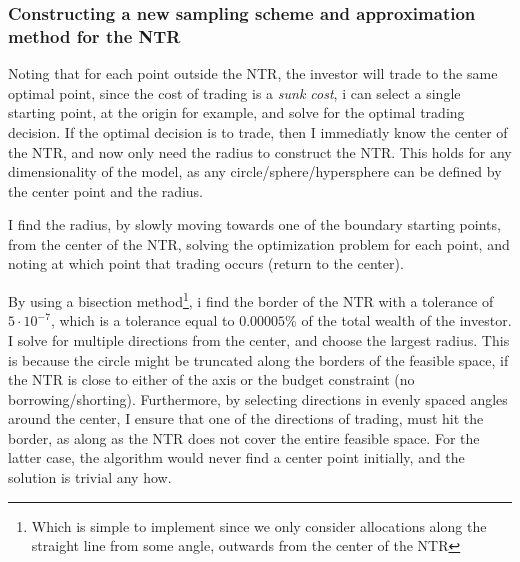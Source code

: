 \documentclass[11pt]{article}
\begin{document}
\subsubsection{Constructing a new sampling scheme and approximation method for the NTR} \label{Subsubsection: SampleFixed}
Noting that for each point outside the NTR, the investor will trade to the same optimal point, since the cost of trading is a \textit{sunk cost},
i can select a single starting point, at the origin for example, and solve for the optimal trading decision.
If the optimal decision is to trade, then I immediatly know the center of the \ac{NTR}, and now only need the radius to construct the \ac{NTR}.
This holds for any dimensionality of the model, as any circle/sphere/hypersphere can be defined by the center point and the radius.

I find the radius, by slowly moving towards one of the boundary starting points, from the center of the NTR, solving the optimization problem for each point,
and noting at which point that trading occurs (return to the center).

By using a bisection method\footnote{Which is simple to implement since we only consider allocations along the straight line from some angle, outwards from the center of the NTR},
i find the border of the \ac{NTR} with a tolerance of $5\cdot 10^{-7}$,
which is a tolerance equal to $0.00005\%$ of the total wealth of the investor. 
I solve for multiple directions from the center, and choose the largest radius. This is because the circle might be truncated along the borders of the feasible space,
if the NTR is close to either of the axis or the budget constraint (no borrowing/shorting).
Furthermore, by selecting directions in evenly spaced angles around the center, I ensure that one of the directions of trading, must hit the border, as along as the \ac{NTR} does not cover the entire feasible space.
For the latter case, the algorithm would never find a center point initially, and the solution is trivial any how.
\end{document}
